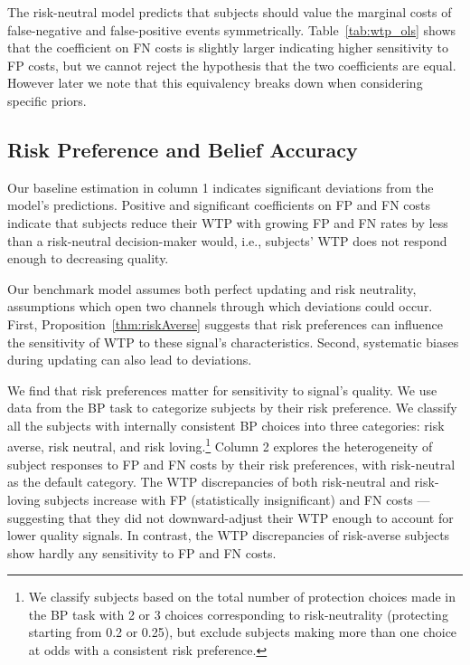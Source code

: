 \documentclass[12pt,a4paper]{article}
\begin{document}


The risk-neutral model predicts that subjects should value the marginal costs of false-negative and false-positive events symmetrically. Table~\ref{tab:wtp_ols} shows that the coefficient on FN costs is slightly larger indicating higher sensitivity to FP costs, but we cannot reject the hypothesis that the two coefficients are equal. However later we note that this equivalency breaks down when considering specific priors.

\subsection{Risk Preference and Belief Accuracy}

Our baseline estimation in column 1 indicates significant deviations from the model's predictions. Positive and significant coefficients on FP and FN costs indicate that subjects reduce their WTP with growing FP and FN rates by less than a risk-neutral decision-maker would, i.e., subjects' WTP does not respond enough to decreasing quality.

Our benchmark model assumes both perfect updating and risk neutrality, assumptions which open two channels through which deviations could occur. First, Proposition~\ref{thm:riskAverse} suggests that risk preferences can influence the sensitivity of WTP to these signal's characteristics. Second, systematic biases during updating can also lead to deviations. 

We find that risk preferences matter for sensitivity to signal's quality. We use data from the BP task to categorize subjects by their risk preference. We classify all the subjects with internally consistent BP choices into three categories: risk averse, risk neutral, and risk loving.\footnote{We classify subjects based on the total number of protection choices made in the BP task with 2 or 3 choices corresponding to risk-neutrality (protecting starting from 0.2 or 0.25), but exclude subjects making more than one choice at odds with a consistent risk preference.} Column 2 explores the heterogeneity of subject responses to FP and FN costs by their risk preferences, with risk-neutral as the default category. 
The WTP discrepancies of both risk-neutral and risk-loving subjects increase with FP (statistically insignificant) and FN costs --- suggesting that they did not downward-adjust their WTP enough to account for lower quality signals. In contrast, the WTP discrepancies of risk-averse subjects show hardly any sensitivity to FP and FN costs.  
\end{document}
